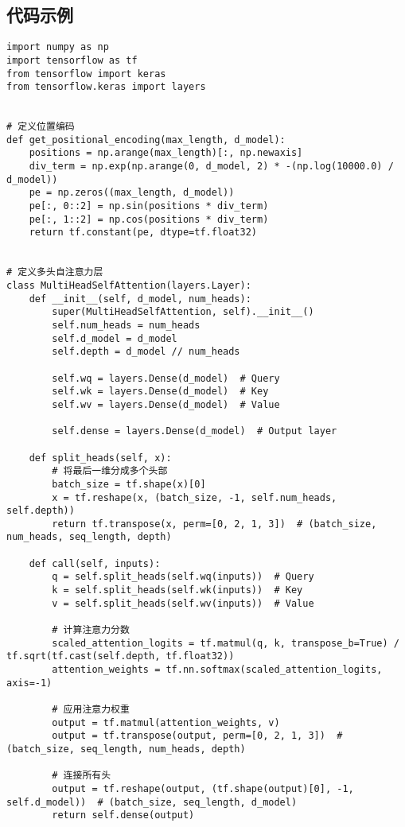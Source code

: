 \subsection*{代码示例}
\begin{lstlisting}
import numpy as np
import tensorflow as tf
from tensorflow import keras
from tensorflow.keras import layers


# 定义位置编码
def get_positional_encoding(max_length, d_model):
    positions = np.arange(max_length)[:, np.newaxis]
    div_term = np.exp(np.arange(0, d_model, 2) * -(np.log(10000.0) / d_model))
    pe = np.zeros((max_length, d_model))
    pe[:, 0::2] = np.sin(positions * div_term)
    pe[:, 1::2] = np.cos(positions * div_term)
    return tf.constant(pe, dtype=tf.float32)


# 定义多头自注意力层
class MultiHeadSelfAttention(layers.Layer):
    def __init__(self, d_model, num_heads):
        super(MultiHeadSelfAttention, self).__init__()
        self.num_heads = num_heads
        self.d_model = d_model
        self.depth = d_model // num_heads

        self.wq = layers.Dense(d_model)  # Query
        self.wk = layers.Dense(d_model)  # Key
        self.wv = layers.Dense(d_model)  # Value

        self.dense = layers.Dense(d_model)  # Output layer

    def split_heads(self, x):
        # 将最后一维分成多个头部
        batch_size = tf.shape(x)[0]
        x = tf.reshape(x, (batch_size, -1, self.num_heads, self.depth))
        return tf.transpose(x, perm=[0, 2, 1, 3])  # (batch_size, num_heads, seq_length, depth)

    def call(self, inputs):
        q = self.split_heads(self.wq(inputs))  # Query
        k = self.split_heads(self.wk(inputs))  # Key
        v = self.split_heads(self.wv(inputs))  # Value

        # 计算注意力分数
        scaled_attention_logits = tf.matmul(q, k, transpose_b=True) / tf.sqrt(tf.cast(self.depth, tf.float32))
        attention_weights = tf.nn.softmax(scaled_attention_logits, axis=-1)

        # 应用注意力权重
        output = tf.matmul(attention_weights, v)
        output = tf.transpose(output, perm=[0, 2, 1, 3])  # (batch_size, seq_length, num_heads, depth)

        # 连接所有头
        output = tf.reshape(output, (tf.shape(output)[0], -1, self.d_model))  # (batch_size, seq_length, d_model)
        return self.dense(output)



\end{lstlisting}
